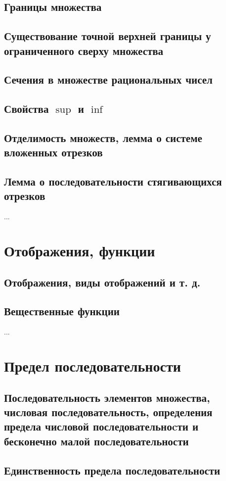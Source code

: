 \subsection{Границы множества}
\subsection{Существование точной верхней границы у ограниченного сверху множества}
\subsection{Сечения в множестве рациональных чисел}
\subsection{Свойства $\sup$ и $\inf$}
\subsection{Отделимость множеств, лемма о системе вложенных отрезков}
\subsection{Лемма о последовательности стягивающихся отрезков}
...

\section{Отображения, функции}
\subsection{Отображения, виды отображений и т. д.}
\subsection{Вещественные функции}
...

\section{Предел последовательности}
\subsection{Последовательность элементов множества, числовая последовательность, определения предела числовой последовательноcти и бесконечно малой последовательности}
\subsection{Единственность предела последовательности}
